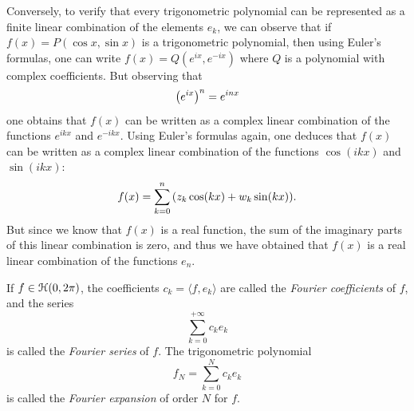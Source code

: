 Conversely, to verify that every trigonometric polynomial can be represented as
a finite linear combination of the elements $e_k$, we can observe that if $f(x)
= P(\cos x,\sin x)$ is a trigonometric polynomial, then using Euler's formulas,
one can write $f(x) = Q(e^{ix}, e^{-ix})$ where $Q$ is a polynomial with complex
coefficients. But observing that
\[
  {\left( e^{ix} \right)}^n = e^{inx}
\]
one obtains that $f(x)$ can be written as a complex linear combination of the
functions $e^{ikx}$ and $e^{-ikx}$. Using Euler's formulas again, one deduces
that $f(x)$ can be written as a complex linear combination of the functions
$\cos(ikx)$ and $\sin(ikx)$:
\[
  f(x) = \sum_{k=0}^n {\left( z_k \cos(kx) + w_k \sin(kx) \right)}.
\]
But since we know that $f(x)$ is a real function, the sum of the imaginary parts
of this linear combination is zero, and thus we have obtained that $f(x)$ is a
real linear combination of the functions $e_n$.

\begin{definition}
If $f\in \mathcal H(0,2\pi)$, the coefficients $c_k = \langle f, e_k\rangle$ are called
the \emph{Fourier coefficients}%
 of $f$, and the series
\[
  \sum_{k=0}^{+\infty} c_k e_k
\]
is called the \emph{Fourier series}%
 of $f$. The trigonometric polynomial
\[
  f_N = \sum_{k=0}^{N} c_k e_k
\]
is called the \emph{Fourier expansion}%
 of order $N$ for $f$.
\end{definition}

